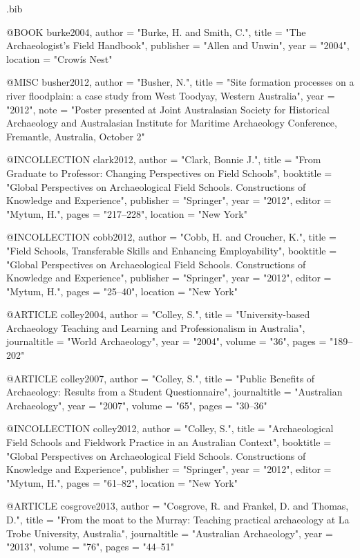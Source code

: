 \begin{filecontents}{\IJSRAidentifier.bib}
	
	@BOOK {burke2004,
		author    = "Burke, H. and Smith, C.",
		title     = "The Archaeologist's Field Handbook",
		publisher = "Allen and Unwin",
		year      = "2004",
		location   = "Crowís Nest"
	}
	
	
	@MISC {busher2012,
		author = "Busher, N.",
		title  = "Site formation processes on a river floodplain: a case study from West Toodyay, Western Australia",
		year   = "2012",
		note   = "Poster presented at Joint Australasian Society for Historical Archaeology and Australasian Institute for Maritime Archaeology Conference, Fremantle, Australia, October 2"
	}
	
	
	@INCOLLECTION {clark2012,
		author    = "Clark, Bonnie J.",
		title     = "From Graduate to Professor: Changing Perspectives on Field Schools",
		booktitle = "Global Perspectives on Archaeological Field Schools. Constructions of Knowledge and Experience",
		publisher = "Springer",
		year      = "2012",
		editor    = "Mytum, H.",
		pages     = "217--228",
		location   = "New York"
	}
	
	
	@INCOLLECTION {cobb2012,
		author    = "Cobb, H. and Croucher, K.",
		title     = "Field Schools, Transferable Skills and Enhancing Employability",
		booktitle = "Global Perspectives on Archaeological Field Schools. Constructions of Knowledge and Experience",
		publisher = "Springer",
		year      = "2012",
		editor    = "Mytum, H.",
		pages     = "25--40",
		location   = "New York"
	}
	
	
	@ARTICLE {colley2004,
		author  = "Colley, S.",
		title   = "University-based Archaeology Teaching and Learning and Professionalism in Australia",
		journaltitle = "World Archaeology",
		year    = "2004",
		volume  = "36",
		pages   = "189--202"
	}
	
	
	@ARTICLE {colley2007,
		author  = "Colley, S.",
		title   = "Public Benefits of Archaeology: Results from a Student Questionnaire",
		journaltitle = "Australian Archaeology",
		year    = "2007",
		volume  = "65",
		pages   = "30--36"
	}
	
	
	@INCOLLECTION {colley2012,
		author    = "Colley, S.",
		title     = "Archaeological Field Schools and Fieldwork Practice in an Australian Context",
		booktitle = "Global Perspectives on Archaeological Field Schools. Constructions of Knowledge and Experience",
		publisher = "Springer",
		year      = "2012",
		editor    = "Mytum, H.",
		pages     = "61--82",
		location   = "New York"
	}
	
	
	@ARTICLE {cosgrove2013,
		author  = "Cosgrove, R. and Frankel, D. and Thomas, D.",
		title   = "From the moat to the Murray: Teaching practical archaeology at La Trobe University, Australia",
		journaltitle = "Australian Archaeology",
		year    = "2013",
		volume  = "76",
		pages   = "44--51"
	}
	

\end{filecontents}
